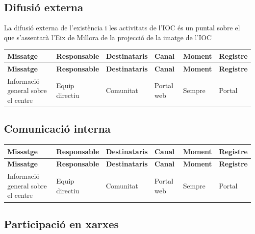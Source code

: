 \documentclass[fontsize=10pt,%
paper=a4,%
DIV=14,%
pagesize=auto,%
parskip=half,
captions=tableheading,%
numbers=noenddot,%
toc=graduated%
]{scrartcl}
\renewcommand{\arraystretch}{1.75}%
\renewcommand{\arraystretch}{1.75}%
\begin{document}
\subsection{Difusió externa}

La difusió externa de l'existència i les activitats de l'IOC és un puntal sobre el que s'assentarà l'Eix de Millora de la projecció de la imatge de l'IOC

\small{
\setlength{\tabcolsep}{10pt}
\renewcommand{\arraystretch}{1.5}
\begin{longtable}{p{3cm}p{2cm}p{2cm}p{1.5cm}p{2cm}p{1.5cm}}
\hline
\textbf{Missatge}  & \textbf{Responsable} & \textbf{Destinataris} & \textbf{Canal} & \textbf{Moment} & \textbf{Registre}\\
\hline \endfirsthead
\hline
\textbf{Missatge}  & \textbf{Responsable} & \textbf{Destinataris} & \textbf{Canal} & \textbf{Moment} & \textbf{Registre}\\
\hline \endhead
Informació general sobre el centre & Equip directiu & Comunitat & Portal web & Sempre & Portal\\
\end{longtable}
}%


\subsection{Comunicació interna}

\small{
\setlength{\tabcolsep}{10pt}
\renewcommand{\arraystretch}{1.5}
\begin{longtable}{p{3cm}p{2cm}p{2cm}p{1.5cm}p{2cm}p{1.5cm}}
\hline
\textbf{Missatge}  & \textbf{Responsable} & \textbf{Destinataris} & \textbf{Canal} & \textbf{Moment} & \textbf{Registre}\\
\hline \endfirsthead
\hline
\textbf{Missatge}  & \textbf{Responsable} & \textbf{Destinataris} & \textbf{Canal} & \textbf{Moment} & \textbf{Registre}\\
\hline \endhead
Informació general sobre el centre & Equip directiu & Comunitat & Portal web & Sempre & Portal\\
\end{longtable}
}%

\subsection{Participació en xarxes}
\end{document}
